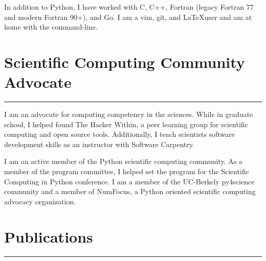\documentclass[letterpaper,11pt]{article}
\newcommand{\sectionline}{\vspace{-0.05in}\hrule\vspace{0.05in}}
\begin{document}
In addition to Python, I have worked with C, C++, Fortran (legacy Fortran 77
and modern Fortran 90+), and Go.  I am a vim, git, and \LaTeX user and am at
home with the command-line.


\section*{Scientific Computing Community Advocate}
\sectionline
I am an advocate for computing competency in the sciences.  While in graduate
school, I helped found The Hacker Within, a peer learning group for scientific
computing and open source tools.  Additionally, I teach scientists software
development skills as an instructor with  Software Carpentry.

I am an active member of the Python scientific computing community.   As a
member of the program committee, I helped set the program for the Scientific
Computing in Python conference.  I am a member of the UC-Berkely py4science
community and a member of NumFocus, a Python oriented scientific
computing advocacy organization.



\pagebreak

\section*{Publications}
\hrule
\vspace{0.05in}





\end{document}
